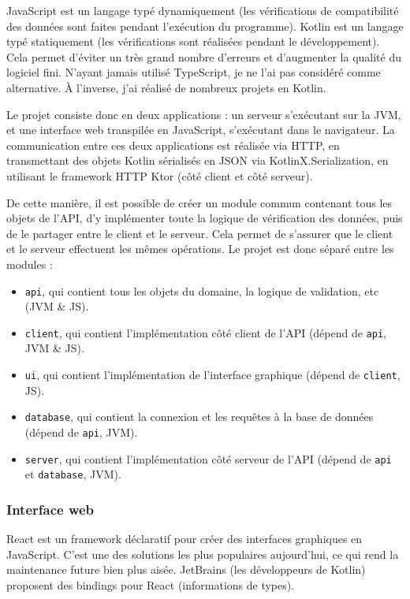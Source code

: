 JavaScript est un langage typé dynamiquement (les vérifications de compatibilité des données sont faites pendant l’exécution du programme).
Kotlin est un langage typé statiquement (les vérifications sont réalisées pendant le développement).
Cela permet d’éviter un très grand nombre d’erreurs et d’augmenter la qualité du logiciel fini.
N’ayant jamais utilisé TypeScript, je ne l’ai pas considéré comme alternative.
À l'inverse, j'ai réalisé de nombreux projets en Kotlin.

\uparagraph
Le projet consiste donc en deux applications : un serveur s’exécutant sur la JVM, et une interface web transpilée en JavaScript, s’exécutant dans le navigateur.
La communication entre ces deux applications est réalisée via HTTP, en transmettant des objets Kotlin sérialisés en JSON via KotlinX.Serialization, en utilisant le framework HTTP Ktor (côté client et côté serveur).

De cette manière, il est possible de créer un module commun contenant tous les objets de l’API, d’y implémenter toute la logique de vérification des données, puis de le partager entre le client et le serveur.
Cela permet de s’assurer que le client et le serveur effectuent les mêmes
opérations.
Le projet est donc séparé entre les modules :
\begin{itemize}
	\item \lstinline{api}, qui contient tous les objets du domaine, la logique de validation, etc (JVM \& JS).
	\item \lstinline{client}, qui contient l’implémentation côté client de l’API (dépend de \lstinline{api}, JVM \& JS).
	\item \lstinline{ui}, qui contient l’implémentation de l’interface graphique (dépend de \lstinline{client}, JS).
	\item \lstinline{database}, qui contient la connexion et les requêtes à la base de données (dépend de \lstinline{api}, JVM).
	\item \lstinline{server}, qui contient l’implémentation côté serveur de l’API (dépend de \lstinline{api} et \lstinline{database}, JVM).
\end{itemize}

\subsubsection{Interface web}

React est un framework déclaratif pour créer des interfaces graphiques en JavaScript.
C’est une des solutions les plus populaires aujourd’hui, ce qui rend la maintenance future bien plus aisée.
JetBrains (les développeurs de Kotlin) proposent des bindings pour React (informations de types).

